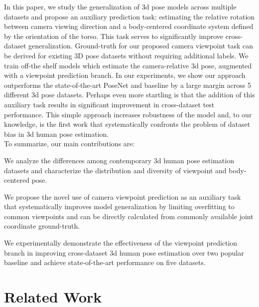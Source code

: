 \documentclass[runningheads]{llncs}
\begin{document}
In this paper, we study the generalization of 3d pose models across multiple
datasets and propose an auxiliary prediction task: estimating the relative rotation between camera viewing direction and a body-centered coordinate system defined by the orientation of the torso. This task serves to
significantly improve cross-dataset generalization. Ground-truth for our
proposed camera viewpoint task can be derived for existing 3D pose datasets
without requiring additional labels. We train off-the shelf models
\cite{rootnet,Zhou_2017_ICCV} which estimate the camera-relative 3d pose,
augmented with a viewpoint prediction branch. In our experiments, we show our
approach outperforms the state-of-the-art PoseNet \cite{rootnet} and
\cite{Zhou_2017_ICCV} baseline by a large margin across 5 different 3d pose
datasets. Perhaps even more startling is that the addition of this auxiliary
task results in significant improvement in cross-dataset test performance.
This simple approach increases robustness of the model and, to our knowledge,
is the first work that systematically confronts the problem of dataset 
bias in 3d human pose estimation.
\\

\noindent To summarize, our main contributions are:

 We analyze the differences among contemporary 3d human pose
estimation datasets and characterize the distribution and diversity of
viewpoint and body-centered pose.

 We propose the novel use of camera viewpoint prediction as an
auxiliary task that systematically improves model generalization by limiting
overfitting to common viewpoints and can be directly calculated from commonly
available joint coordinate ground-truth. 

 We experimentally demonstrate the effectiveness of the viewpoint
prediction branch in improving cross-dataset 3d human pose estimation over two
popular baseline and achieve state-of-the-art performance on five datasets. 

\section{Related Work}
\label{sec:relatedwork}
\end{document}

